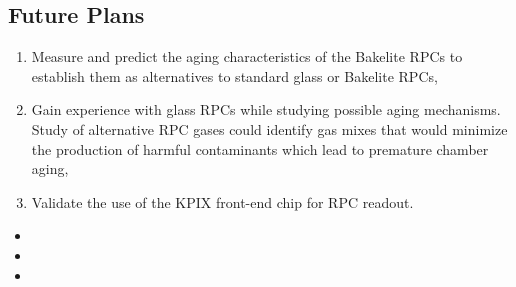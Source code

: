 \subsection{Future Plans}
\begin{enumerate}
\item Measure and predict the aging characteristics of the Bakelite RPCs to establish them as alternatives to standard glass or Bakelite RPCs,
\item Gain experience with glass RPCs while studying possible aging mechanisms. Study of alternative RPC gases could identify gas mixes that would minimize the production of harmful contaminants which lead to premature chamber aging,
\item Validate the use of the KPIX front-end chip for RPC readout.
\end{enumerate}


\begin{itemize}
	\item {}
	\item {}
	\item {}
\end{itemize}
